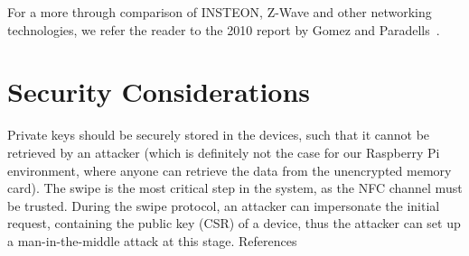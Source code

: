 For a more through comparison of INSTEON, Z-Wave and other networking technologies, we refer the reader to the 2010 report by Gomez and Paradells~\cite{comparison-of-technologies}.

\section{Security Considerations}

Private keys should be securely stored in the devices, such that it cannot be retrieved by an attacker (which is definitely not the case for our Raspberry Pi environment, where anyone can retrieve the data from the unencrypted memory card).
The swipe is the most critical step in the system, as the NFC channel must be trusted. During the swipe protocol, an attacker can impersonate the initial request, containing the public key (CSR) of a device, thus the attacker can set up a man-in-the-middle attack at this stage.
References
